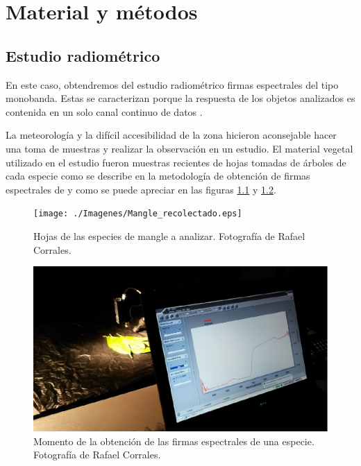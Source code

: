 


\chapter{Material y métodos}
\label{cap:materialymetodos}

\section{Estudio radiométrico}
En este caso, obtendremos del estudio radiométrico firmas espectrales del tipo monobanda. Estas se caracterizan porque la respuesta de los objetos analizados es contenida en un solo canal continuo de datos \citep{andinofase1}.\Sep

La meteorología y la difícil accesibilidad de la zona hicieron aconsejable hacer una toma de muestras y realizar la observación en un estudio. El material vegetal utilizado en el estudio fueron muestras recientes de hojas tomadas de árboles de cada especie como se describe en la metodología de obtención de firmas espectrales de \cite{andinofase2} y como se puede apreciar en las figuras \ref{fig:mangle_recolectado} y \ref{fig:curva_espectral}.

\begin{figure}
	\centering
	\texttt{[image: ./Imagenes/Mangle\_recolectado.eps]}
	\caption[Mangle recolectado]{Hojas de las especies de mangle a analizar. Fotografía de Rafael Corrales.}
	\label{fig:mangle_recolectado}
\end{figure}

\begin{figure}
	\centering
	\includegraphics[width=0.9\linewidth]{./Imagenes/Curva_espectral.eps}
	\caption[Obtención de firmas]{Momento de la obtención de las firmas espectrales de una especie. Fotografía de Rafael Corrales.}
	\label{fig:curva_espectral}
\end{figure}

